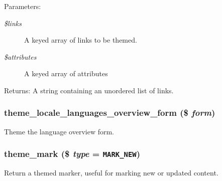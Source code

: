 \begin{Desc}
\item[Parameters:]
\begin{description}
\item[{\em \$links}]A keyed array of links to be themed. \item[{\em \$attributes}]A keyed array of attributes \end{description}
\end{Desc}
\begin{Desc}
\item[Returns:]A string containing an unordered list of links. \end{Desc}
\hypertarget{group__themeable_gc8da78f85ea472d2e50a0f32047c245f}{
\subsubsection[{theme\_\-locale\_\-languages\_\-overview\_\-form}]{\setlength{\rightskip}{0pt plus 5cm}theme\_\-locale\_\-languages\_\-overview\_\-form (\$ {\em form})}}
\label{group__themeable_gc8da78f85ea472d2e50a0f32047c245f}


Theme the language overview form. \hypertarget{group__themeable_gf27d1fe596ce8f28199ca2bed5b9816d}{
\subsubsection[{theme\_\-mark}]{\setlength{\rightskip}{0pt plus 5cm}theme\_\-mark (\$ {\em type} = {\tt MARK\_\-NEW})}}
\label{group__themeable_gf27d1fe596ce8f28199ca2bed5b9816d}


Return a themed marker, useful for marking new or updated content.

